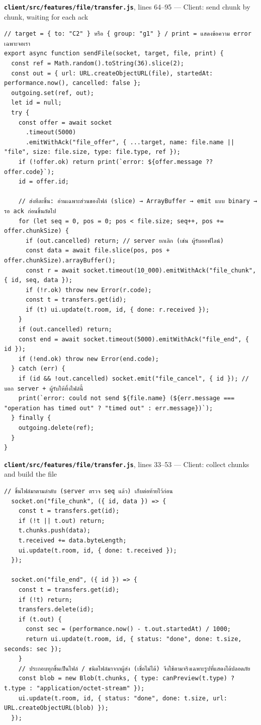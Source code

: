 \documentclass[11pt,a4paper]{article}
\newcommand{\code}[1]{\texttt{#1}}
\newcommand{\snap}[3]{\par\medskip\textbf{\code{#1}}, lines #2 --- #3}
\begin{document}
\snap{client/src/features/file/transfer.js}{64--95}{Client: send chunk by chunk, waiting for each ack}
\begin{Verbatim}[firstnumber=64]
// target = { to: "C2" } หรือ { group: "g1" } / print = แสดงข้อความ error เฉพาะจอเรา
export async function sendFile(socket, target, file, print) {
  const ref = Math.random().toString(36).slice(2);
  const out = { url: URL.createObjectURL(file), startedAt: performance.now(), cancelled: false };
  outgoing.set(ref, out);
  let id = null;
  try {
    const offer = await socket
      .timeout(5000)
      .emitWithAck("file_offer", { ...target, name: file.name || "file", size: file.size, type: file.type, ref });
    if (!offer.ok) return print(`error: ${offer.message ?? offer.code}`);
    id = offer.id;

    // ส่งทีละชิ้น: อ่านเฉพาะส่วนของไฟล์ (slice) → ArrayBuffer → emit แบบ binary → รอ ack ก่อนชิ้นถัดไป
    for (let seq = 0, pos = 0; pos < file.size; seq++, pos += offer.chunkSize) {
      if (out.cancelled) return; // server ยกเลิก (เช่น ผู้รับออฟไลน์)
      const data = await file.slice(pos, pos + offer.chunkSize).arrayBuffer();
      const r = await socket.timeout(10_000).emitWithAck("file_chunk", { id, seq, data });
      if (!r.ok) throw new Error(r.code);
      const t = transfers.get(id);
      if (t) ui.update(t.room, id, { done: r.received });
    }
    if (out.cancelled) return;
    const end = await socket.timeout(5000).emitWithAck("file_end", { id });
    if (!end.ok) throw new Error(end.code);
  } catch (err) {
    if (id && !out.cancelled) socket.emit("file_cancel", { id }); // บอก server + ผู้รับให้ทิ้งไฟล์นี้
    print(`error: could not send ${file.name} (${err.message === "operation has timed out" ? "timed out" : err.message})`);
  } finally {
    outgoing.delete(ref);
  }
}
\end{Verbatim}

\snap{client/src/features/file/transfer.js}{33--53}{Client: collect chunks and build the file}
\begin{Verbatim}[firstnumber=33]
  // ชิ้นไฟล์มาตามลำดับ (server ตรวจ seq แล้ว) เก็บต่อท้ายไว้ก่อน
  socket.on("file_chunk", ({ id, data }) => {
    const t = transfers.get(id);
    if (!t || t.out) return;
    t.chunks.push(data);
    t.received += data.byteLength;
    ui.update(t.room, id, { done: t.received });
  });

  socket.on("file_end", ({ id }) => {
    const t = transfers.get(id);
    if (!t) return;
    transfers.delete(id);
    if (t.out) {
      const sec = (performance.now() - t.out.startedAt) / 1000;
      return ui.update(t.room, id, { status: "done", done: t.size, seconds: sec });
    }
    // ประกอบทุกชิ้นเป็นไฟล์ / ชนิดไฟล์มาจากผู้ส่ง (เชื่อไม่ได้) จึงใช้ตามจริงเฉพาะรูปที่แสดงได้ปลอดภัย
    const blob = new Blob(t.chunks, { type: canPreview(t.type) ? t.type : "application/octet-stream" });
    ui.update(t.room, id, { status: "done", done: t.size, url: URL.createObjectURL(blob) });
  });
\end{Verbatim}
\end{document}

